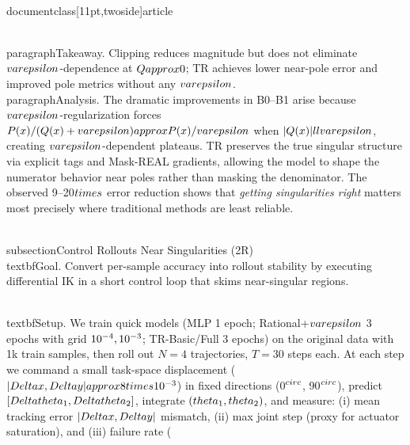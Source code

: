 \\documentclass[11pt,twoside]{article}
\begin{document}
\\paragraph{Takeaway.} Clipping reduces magnitude but does not eliminate $\\varepsilon$-dependence at $Q\\approx 0$; TR achieves lower near-pole error and improved pole metrics without any $\\varepsilon$.
\\paragraph{Analysis.} The dramatic improvements in B0--B1 arise because $\\varepsilon$-regularization forces $P(x)/(Q(x)+\\varepsilon) \\approx P(x)/\\varepsilon$ when $|Q(x)| \\ll \\varepsilon$, creating $\\varepsilon$-dependent plateaus. TR preserves the true singular structure via explicit tags and Mask-REAL gradients, allowing the model to shape the numerator behavior near poles rather than masking the denominator. The observed 9--20$\\times$ error reduction shows that \emph{getting singularities right} matters most precisely where traditional methods are least reliable.

\\subsection{Control Rollouts Near Singularities (2R)}
\\textbf{Goal.} Convert per-sample accuracy into rollout stability by executing differential IK in a short control loop that skims near-singular regions.

\\textbf{Setup.} We train quick models (MLP 1 epoch; Rational+$\\varepsilon$ 3 epochs with grid $\\{10^{-4},10^{-3}\\}$; TR-Basic/Full 3 epochs) on the original data with 1k train samples, then roll out $N=4$ trajectories, $T=30$ steps each. At each step we command a small task-space displacement ($\\|\\Delta x,\\Delta y\\|\\approx 8\\times10^{-3}$) in fixed directions (0$^{\\circ}$, 90$^{\\circ}$), predict $[\\Delta\\theta_1,\\Delta\\theta_2]$, integrate $(\\theta_1,\\theta_2)$, and measure: (i) mean tracking error $\\|\\Delta x,\\Delta y\\|$ mismatch, (ii) max joint step (proxy for actuator saturation), and (iii) failure rate (%
\end{document}
